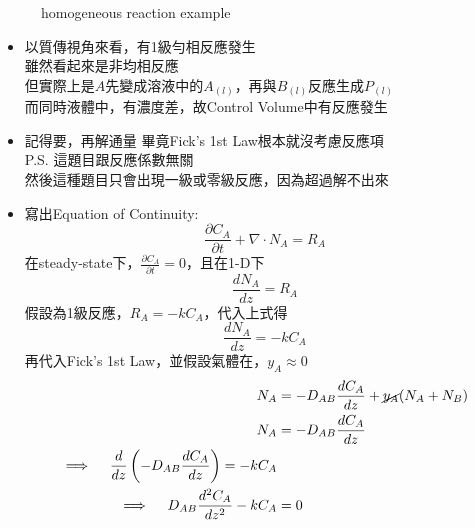 \documentclass[../main.tex]{subfiles}
\begin{document}
\begin{itemize}
\begin{figure}[H]
    \caption{homogeneous reaction example}
  \end{figure}
  \begin{itemize}
    \item 以質傳視角來看，有1級勻相反應發生\\
    雖然看起來是非均相反應\\
    但實際上是$A$先變成溶液中的$A_{(l)}$，再與$B_{(l)}$反應生成$P_{(l)}$\\
    而同時液體中，有濃度差，故Control Volume中有反應發生
    \item 記得要，再解通量
    畢竟Fick's 1st Law根本就沒考慮反應項\\
    P.S. 這題目跟反應係數無關\\
    然後這種題目只會出現一級或零級反應，因為超過解不出來
    \item 寫出Equation of Continuity:
    \begin{equation}
      \frac{\partial C_A}{\partial t} +\nabla \cdot N_A = R_A
    \end{equation}
    在steady-state下，$\frac{\partial C_A}{\partial t} = 0$，且在1-D下
    \begin{equation}
      \frac{d N_A}{dz} = R_A
    \end{equation}
    假設為1級反應，$R_A = -k C_A$，代入上式得
    \begin{equation}
      \frac{d N_A}{dz} = -k C_A
    \end{equation}
    再代入Fick's 1st Law，並假設氣體在，$y_A \approx 0$
    \begin{align}
      N_A &= -D_{AB}\frac{d C_A}{dz} + \cancel{y_A}(N_A + N_B) \nonumber \\
      N_A &= -D_{AB}\frac{d C_A}{dz} \nonumber \\
      \implies \quad 
      \frac{d}{dz}\left(
        -D_{AB}\frac{d C_A}{dz}
      \right) = -k C_A \nonumber \\
      \implies \quad 
      D_{AB}\frac{d^2 C_A}{dz^2} - k C_A &= 0 \label{eq:ch4_7_homogeneous_reaction_diff_eq}
    \end{align}

\end{itemize}
\end{itemize}
\end{document}
